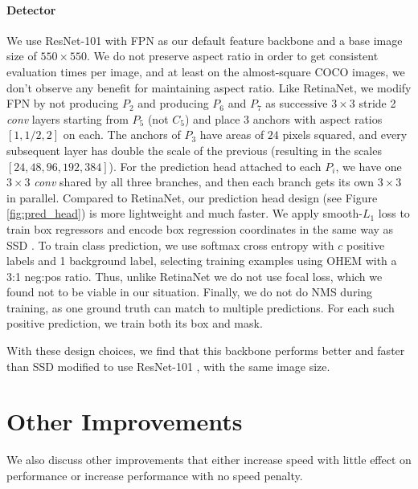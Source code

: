 \documentclass[10pt,journal,compsoc]{IEEEtran}
\begin{document}
\paragraph{\methodname{} Detector}
We use ResNet-101 \cite{resnet} with FPN \cite{fpn} as our default feature backbone and a base image size of $550 \times 550$. We do not preserve aspect ratio in order to get consistent evaluation times per image, and at least on the almost-square COCO images, we don't observe any benefit for maintaining aspect ratio. Like RetinaNet, we modify FPN by not producing $P_2$ and producing $P_6$ and $P_7$ as successive $3 \times 3$ stride 2 \textit{conv} layers starting from $P_5$ (not $C_5$) and place 3 anchors with aspect ratios $[1, 1/2, 2]$ on each. The anchors of $P_3$ have areas of $24$ pixels squared, and every subsequent layer has double the scale of the previous (resulting in the scales $[24, 48, 96, 192, 384]$). For the prediction head attached to each $P_i$, we have one $3 \times 3$ \textit{conv} shared by all three branches, and then each branch gets its own $3 \times 3$  in parallel. Compared to RetinaNet, our prediction head design (see Figure \ref{fig:pred_head}) is more lightweight and much faster. We apply smooth-$L_1$ loss to train box regressors and encode box regression coordinates in the same way as SSD \cite{ssd}. To train class prediction, we use softmax cross entropy with $c$ positive labels and 1 background label, selecting training examples using OHEM \cite{ohem} with a 3:1 neg:pos ratio. Thus, unlike RetinaNet we do not use focal loss, which we found not to be viable in our situation. Finally, we do not do NMS during training, as one ground truth can match to multiple predictions. For each such positive prediction, we train both its box and mask.



With these design choices, we find that this backbone performs better and faster than SSD \cite{ssd} modified to use ResNet-101 \cite{resnet}, with the same image size.

\section{Other Improvements}
We also discuss other improvements that either increase speed with little effect on performance or increase performance with no speed penalty.
\end{document}
